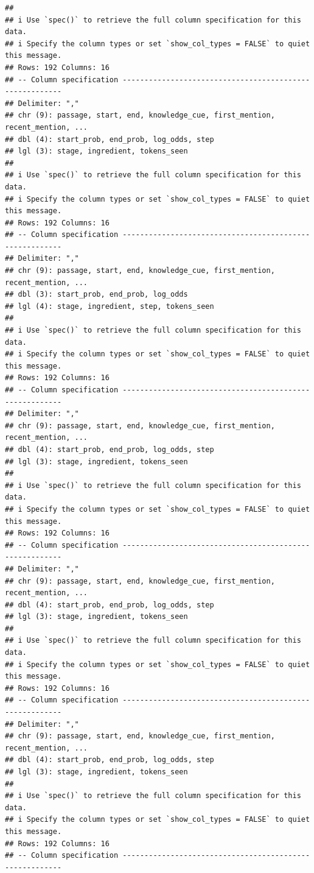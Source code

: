 \documentclass[
]{article}
\begin{document}
\begin{verbatim}
## 
## i Use `spec()` to retrieve the full column specification for this data.
## i Specify the column types or set `show_col_types = FALSE` to quiet this message.
## Rows: 192 Columns: 16
## -- Column specification --------------------------------------------------------
## Delimiter: ","
## chr (9): passage, start, end, knowledge_cue, first_mention, recent_mention, ...
## dbl (4): start_prob, end_prob, log_odds, step
## lgl (3): stage, ingredient, tokens_seen
## 
## i Use `spec()` to retrieve the full column specification for this data.
## i Specify the column types or set `show_col_types = FALSE` to quiet this message.
## Rows: 192 Columns: 16
## -- Column specification --------------------------------------------------------
## Delimiter: ","
## chr (9): passage, start, end, knowledge_cue, first_mention, recent_mention, ...
## dbl (3): start_prob, end_prob, log_odds
## lgl (4): stage, ingredient, step, tokens_seen
## 
## i Use `spec()` to retrieve the full column specification for this data.
## i Specify the column types or set `show_col_types = FALSE` to quiet this message.
## Rows: 192 Columns: 16
## -- Column specification --------------------------------------------------------
## Delimiter: ","
## chr (9): passage, start, end, knowledge_cue, first_mention, recent_mention, ...
## dbl (4): start_prob, end_prob, log_odds, step
## lgl (3): stage, ingredient, tokens_seen
## 
## i Use `spec()` to retrieve the full column specification for this data.
## i Specify the column types or set `show_col_types = FALSE` to quiet this message.
## Rows: 192 Columns: 16
## -- Column specification --------------------------------------------------------
## Delimiter: ","
## chr (9): passage, start, end, knowledge_cue, first_mention, recent_mention, ...
## dbl (4): start_prob, end_prob, log_odds, step
## lgl (3): stage, ingredient, tokens_seen
## 
## i Use `spec()` to retrieve the full column specification for this data.
## i Specify the column types or set `show_col_types = FALSE` to quiet this message.
## Rows: 192 Columns: 16
## -- Column specification --------------------------------------------------------
## Delimiter: ","
## chr (9): passage, start, end, knowledge_cue, first_mention, recent_mention, ...
## dbl (4): start_prob, end_prob, log_odds, step
## lgl (3): stage, ingredient, tokens_seen
## 
## i Use `spec()` to retrieve the full column specification for this data.
## i Specify the column types or set `show_col_types = FALSE` to quiet this message.
## Rows: 192 Columns: 16
## -- Column specification --------------------------------------------------------

\end{verbatim}
\end{document}
